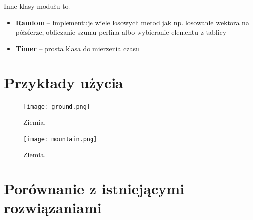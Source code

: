 \documentclass[inz,longabstract]{iithesis}
\begin{document}
            Inne klasy modułu to:
            \begin{itemize}
                \item \textbf{Random} -- implementuje wiele losowych metod jak np. losowanie wektora na półsferze, obliczanie szumu perlina albo wybieranie elementu z tablicy
                \item \textbf{Timer} -- prosta klasa do mierzenia czasu  
            \end{itemize}
            
\chapter{Przykłady użycia}

        \begin{figure}[H]
            \texttt{[image: ground.png]}
            \caption{Ziemia.} 
            \label{fig:ground}
        \end{figure}
        
        \begin{figure}[H]
            \texttt{[image: mountain.png]}
            \caption{Ziemia.} 
            \label{fig:mountain}
        \end{figure}
        
\chapter{Porównanie z istniejącymi rozwiązaniami}





\end{document}
